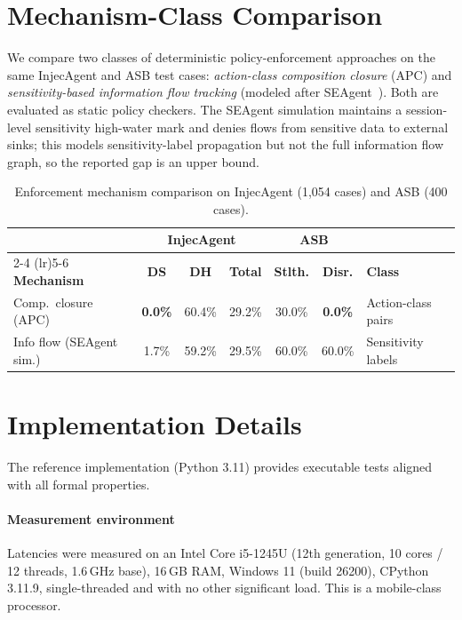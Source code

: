 \documentclass[sigconf,nonacm]{acmart}
\begin{document}
\section{Mechanism-Class Comparison}\label{app:mechanism-comparison}

We compare two classes of deterministic policy-enforcement approaches on the same InjecAgent and ASB test cases: \emph{action-class composition closure} (APC) and \emph{sensitivity-based information flow tracking} (modeled after SEAgent~\cite{ji2026seagent}). Both are evaluated as static policy checkers. The SEAgent simulation maintains a session-level sensitivity high-water mark and denies flows from sensitive data to external sinks; this models sensitivity-label propagation but not the full information flow graph, so the reported gap is an upper bound.

\begin{table}[H]
\centering
\footnotesize
\caption{Enforcement mechanism comparison on InjecAgent (1,054 cases) and ASB (400 cases).}
\label{tab:headtohead}
\begin{tabularx}{\linewidth}{@{}l*{5}{c}>{\raggedright\arraybackslash}X@{}}
\toprule
& \multicolumn{3}{c}{\textbf{InjecAgent}} & \multicolumn{2}{c}{\textbf{ASB}} & \\
\cmidrule(lr){2-4} \cmidrule(lr){5-6}
\textbf{Mechanism} & \textbf{DS} & \textbf{DH} & \textbf{Total} & \textbf{Stlth.} & \textbf{Disr.} & \textbf{Class} \\
\midrule
Comp.\ closure (APC) & \textbf{0.0\%} & 60.4\% & 29.2\% & 30.0\% & \textbf{0.0\%} & Action-class pairs \\
Info flow (SEAgent sim.) & 1.7\% & 59.2\% & 29.5\% & 60.0\% & 60.0\% & Sensitivity labels \\
\bottomrule
\end{tabularx}
\end{table}

\section{Implementation Details}\label{app:implementation}

The reference implementation (Python 3.11) provides executable tests aligned with all formal properties.

\paragraph{Measurement environment} Latencies were measured on an Intel Core i5-1245U (12th generation, 10 cores / 12 threads, 1.6\,GHz base), 16\,GB RAM, Windows 11 (build 26200), CPython 3.11.9, single-threaded and with no other significant load. This is a mobile-class processor.
\end{document}
